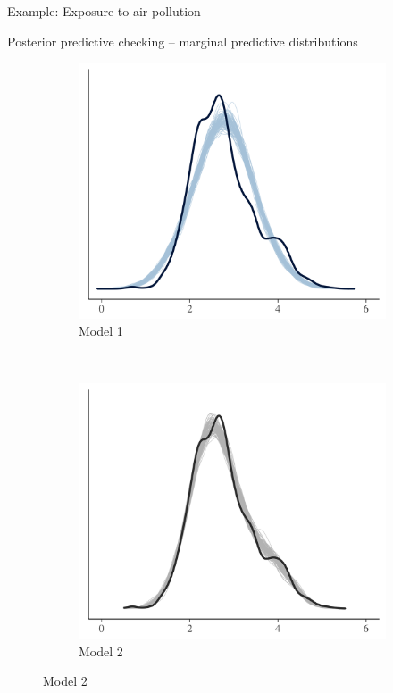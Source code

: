 \documentclass[t]{beamer}
\begin{document}
\begin{frame}

  {\Large\color{navyblue} Example: Exposure to air pollution}

  Posterior predictive checking -- marginal predictive distributions
\begin{figure}
\centering
\begin{subfigure}{0.48\textwidth}
\includegraphics[width=\textwidth]{ppc_dens1.png}
\caption{Model 1}
\end{subfigure}
~
\begin{subfigure}{0.48\textwidth}
\includegraphics[width=\textwidth]{ppc_dens2.png}
\caption{Model 2}
\end{subfigure}
\end{figure}

\end{frame}
\end{document}
